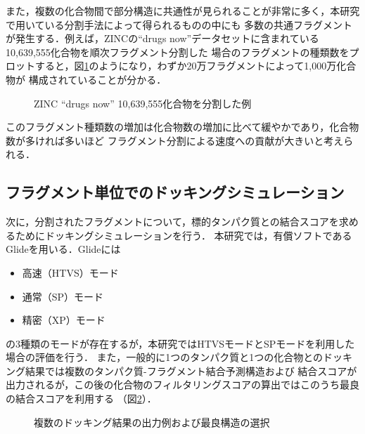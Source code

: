 また，複数の化合物間で部分構造に共通性が見られることが非常に多く，本研究で用いている分割手法によって得られるものの中にも
多数の共通フラグメントが発生する．例えば，ZINCの``drugs now''データセットに含まれている10,639,555化合物を順次フラグメント分割した
場合のフラグメントの種類数をプロットすると，図\ref{fig:decomposition_amount}のようになり，わずか20万フラグメントによって1,000万化合物が
構成されていることが分かる．
\begin{figure}[htp]
 \begin{center}
  \caption{ZINC ``drugs now'' 10,639,555化合物を分割した例}
  \label{fig:decomposition_amount}
 \end{center}
\end{figure}
このフラグメント種類数の増加は化合物数の増加に比べて緩やかであり，化合物数が多ければ多いほど
フラグメント分割による速度への貢献が大きいと考えられる．

\subsection{フラグメント単位でのドッキングシミュレーション}
次に，分割されたフラグメントについて，標的タンパク質との結合スコアを求めるためにドッキングシミュレーションを行う．
本研究では，有償ソフトであるGlide\cite{Friesner2004}を用いる．Glideには
\begin{itemize}
\item 高速（HTVS）モード
\item 通常（SP）モード
\item 精密（XP）モード
\end{itemize}
の3種類のモードが存在するが，本研究ではHTVSモードとSPモードを利用した場合の評価を行う．
また，一般的に1つのタンパク質と1つの化合物とのドッキング結果では複数のタンパク質-フラグメント結合予測構造および
結合スコアが出力されるが，この後の化合物のフィルタリングスコアの算出ではこのうち最良の結合スコアを利用する
（図\ref{fig:fragment_result}）．

\begin{figure}[t]
\begin{minipage}{0.5\hsize}
 \begin{center}
 \end{center}
\end{minipage}
\begin{minipage}{0.5\hsize}
 \begin{center}
 \end{center}
\end{minipage}
 \caption{複数のドッキング結果の出力例および最良構造の選択}
 \label{fig:fragment_result}
\end{figure}

